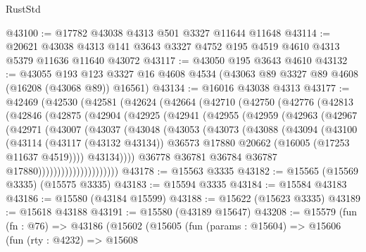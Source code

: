 \begin{lexlean}{RustStd}
\begin{coremodule}
@43100 := @17782 @43038 @4313 @501 @3327 @11644 @11648
@43114 := @20621
    @43038
    @4313
    @141
    @3643
    @3327
    @4752
    @195
    @4519
    @4610
    @4313
    @5379
    @11636
    @11640
    @43072
@43117 := @43050 @195 @3643 @4610
@43132 := @43055
    @193
    @123
    @3327
    @16
    @4608
    @4534
    (@43063 @89 @3327 @89 @4608 (@16208 (@43068 @89)) @16561)
@43134 := @16016 @43038 @4313
@43177 := @42469
    (@42530
      (@42581
        (@42624
          (@42664
            (@42710
              (@42750
                (@42776
                  (@42813
                    (@42846
                      (@42875
                        (@42904
                          (@42925
                            (@42941
                              (@42955
                                (@42959
                                  (@42963
                                    (@42967
                                      (@42971
                                        (@43007
                                          (@43037
                                            (@43048
                                              (@43053
                                                (@43073
                                                  (@43088
                                                    (@43094
                                                      (@43100
                                                        (@43114
                                                          (@43117 (@43132 @43134))
                                                          @36573
                                                          @17880
                                                          @20662
                                                          (@16005 (@17253 @11637 @4519))))
                                                      @43134))))
                                              @36778
                                              @36781
                                              @36784
                                              @36787
                                              @17880)))))))))))))))))))))
@43178 := @15563 @3335
@43182 := @15565 (@15569 @3335) (@15575 @3335)
@43183 := @15594 @3335
@43184 := @15584 @43183
@43186 := @15580 (@43184 @15599)
@43188 := @15622 (@15623 @3335)
@43189 := @15618 @43188
@43191 := @15580 (@43189 @15647)
@43208 := @15579
    (fun (fn : @76) =>
    @43186
      (@15602
        (@15605
          (fun (params : @15604) =>
          @15606
            (fun (rty : @4232) =>
            @15608

\end{coremodule}
\end{lexlean}
